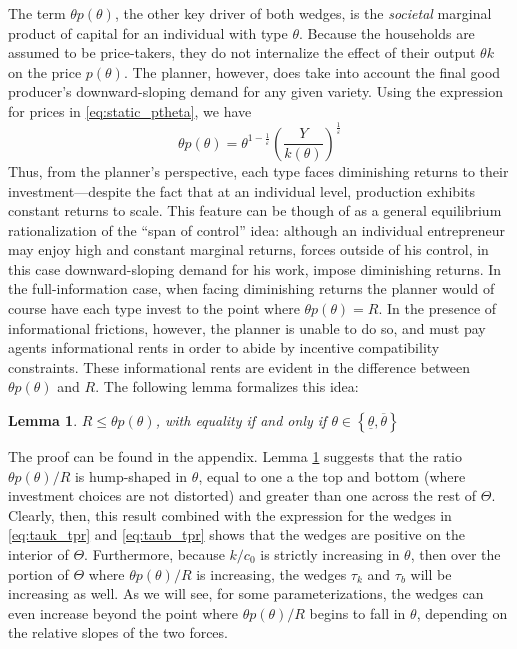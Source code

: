 \documentclass[11pt]{article}
\newtheorem{lemma}{Lemma}
\begin{document}
The term \( \theta p\left( \theta \right) \), the other key driver of both wedges, is the \textit{societal} marginal product of capital for an individual with type \( \theta \). Because the households are assumed to be price-takers, they do not internalize the effect of their output \( \theta k \) on the price \( p(\theta) \). The planner, however, does take into account the final good producer's downward-sloping demand for any given variety. Using the expression for prices in \eqref{eq:static_ptheta}, we have 
\begin{equation}
    \theta p(\theta) = \theta^{1-\frac{1}{\varepsilon}} \left(\frac{Y}{ k\left(\theta\right)}\right)^{\frac{1}{\varepsilon}}
\end{equation}
Thus, from the planner's perspective, each type faces diminishing returns to their investment---despite the fact that at an individual level, production exhibits constant returns to scale. This feature can be though of as a general equilibrium rationalization of the \cite{lucas1978size} ``span of control'' idea: although an individual entrepreneur may enjoy high and constant marginal returns, forces outside of his control, in this case downward-sloping demand for his work, impose diminishing returns. In the full-information case, when facing diminishing returns the planner would of course have each type invest to the point where \( \theta p(\theta) = R \). In the presence of informational frictions, however, the planner is unable to do so, and must pay agents informational rents in order to abide by incentive compatibility constraints. These informational rents are evident in the difference between \( \theta p(\theta) \) and \( R \). The following lemma formalizes this idea:

\begin{lemma} \label{lem:thetap}
    \( R\le\theta p(\theta) \), with equality if and only if \( \theta\in\left\{ \underline{\theta},\overline{\theta}\right\}  \)
\end{lemma}

The proof can be found in the appendix. Lemma \ref{lem:thetap} suggests that the ratio \( \theta p(\theta) /R\) is hump-shaped in \( \theta \), equal to one a the top and bottom (where investment choices are not distorted) and greater than one across the rest of \( \Theta \). Clearly, then, this result combined with the expression for the wedges in \eqref{eq:tauk_tpr} and \eqref{eq:taub_tpr} shows that the wedges are positive on the interior of \( \Theta \). Furthermore, because \( k/c_0 \) is strictly increasing in \( \theta \), then over the portion of \( \Theta \) where \( \theta p(\theta) /R\) is increasing, the wedges \( \tau_k \) and \( \tau_b \) will be increasing as well. As we will see, for some parameterizations, the wedges can even increase beyond the point where \( \theta p(\theta) /R\) begins to fall in \( \theta \), depending on the relative slopes of the two forces. 
\end{document}

